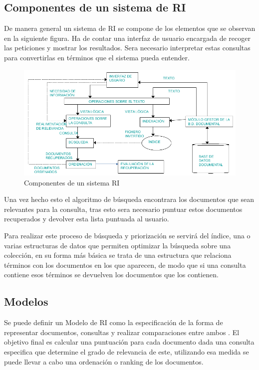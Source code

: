 \subsection{Componentes de un sistema de \acrshort{RI}}
De manera general un sistema de \acrshort{RI} se compone de los elementos que se observan en la siguiente figura. Ha de contar una interfaz de usuario encargada de recoger las peticiones y mostrar los resultados. Sera necesario interpretar estas consultas para convertirlas en términos que el sistema pueda entender.

\begin{figure}[h]
	\centering
	\includegraphics[width=\linewidth]{imagenes/componentes_ri}
	\caption{Componentes de un sistema RI \cite{ApuntesRI}}
	\label{fig:componentes RI}
\end{figure}

Una vez hecho esto el algoritmo de búsqueda encontrara los documentos que sean relevantes para la consulta, tras esto sera necesario puntuar estos documentos recuperados y devolver esta lista puntuada al usuario.

Para realizar este proceso de búsqueda y priorización se servirá del índice, una o varias estructuras de datos que permiten optimizar la búsqueda sobre una colección, en su forma más básica se trata de una estructura que relaciona términos con los documentos en los que aparecen, de modo que si una consulta contiene esos términos se devuelven los documentos que los contienen.

\subsection{Modelos}
Se puede definir un Modelo de \acrshort{RI} como la especificación de la forma de representar documentos, consultas y realizar comparaciones entre ambos \cite{ApuntesRI}. El objetivo final es calcular una puntuación para cada documento dada una consulta especifica que determine el grado de relevancia de este, utilizando esa medida se puede llevar a cabo una ordenación o ranking de los documentos. 

